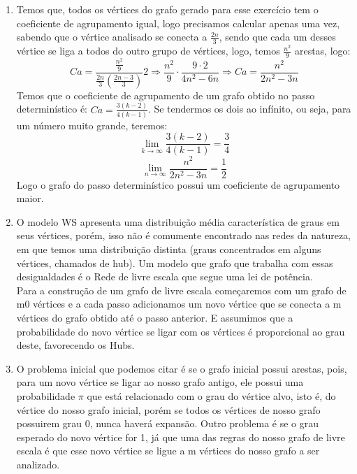 \documentclass[11pt,reqno]{amsart}
\begin{document}
\begin{enumerate}
		

		\vspace{0.3cm}

		\item Temos que, todos os vértices do grafo gerado para esse exercício tem o coeficiente de 
		agrupamento igual, logo precisamos calcular apenas uma vez, sabendo que o vértice analisado se 
		conecta a $\frac{2n}{3}$, sendo que cada um desses vértice se liga a todos do outro grupo de 
		vértices, logo, temos $\frac{n^2}{9}$ arestas, logo: \[ C\textit{a} = \frac{\frac{n^2}{9}}{\frac{2n}
		{3}(\frac{2n-3}{3})}{2} \Rightarrow \frac{n^2}{9} \cdot \frac{9\cdot 2}{4n^2-6n} \Rightarrow C
		\textit{a} = \frac{n^2}{2n^2-3n} \] Temos que o coeficiente de agrupamento de um grafo obtido no 
		passo determinístico é: $C\textit{a} = \frac{3(k-2)}{4(k-1)}$. Se tendermos os dois ao 
		infínito, ou seja, para um número muito grande, teremos: \[\lim_{k\to\infty} \frac{3(k-2)}{4(k-1)} =
		 \frac{3}{4}\] \[\lim_{n\to\infty} \frac{n^2}{2n^2-3n} = \frac{1}{2}\] Logo o grafo do passo 
		 determinístico possui um coeficiente de agrupamento maior.

		\vspace{1cm}

		\item O modelo WS apresenta uma distribuição média característica de graus em seus vértices, porém, 
		isso não é comumente encontrado nas redes da natureza, em que temos uma distribuição distinta 
		(graus concentrados em alguns vértices, chamados de hub). Um modelo que grafo que trabalha com 
		essas desigualdades é o Rede de livre escala que segue uma lei de potência. \\
		Para a construção de um grafo de livre escala começaremos com um grafo de m0 vértices e a cada passo
		adicionamos um novo vértice que se conecta a m vértices do grafo obtido até o passo anterior. E 
		assumimos que a probabilidade do novo vértice se ligar com os vértices é proporcional ao grau 
		deste, favorecendo os Hubs.

		\vspace{0.3cm}


		\item O problema inicial que podemos citar é se o grafo inicial possui arestas, pois, para um novo 
		vértice se ligar ao nosso grafo antigo, ele possui uma probabilidade $\pi$ que está relacionado com 
		o grau do vértice alvo, isto é, do vértice do nosso grafo inicial, porém se todos os vértices de 
		nosso grafo possuirem grau 0, nunca haverá expansão. Outro problema é se o grau esperado do novo 
		vértice for 1, já que uma das regras do nosso grafo de livre escala é que esse novo vértice se ligue
		a m vértices do nosso grafo a ser analizado. 


\end{enumerate}
\end{document}

